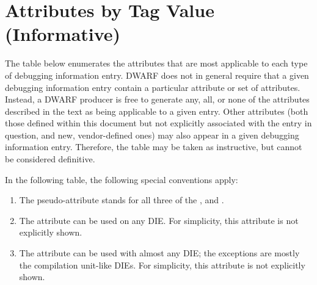 \chapter[Attributes by Tag (Informative)]{Attributes by Tag Value (Informative)}
\label{chap:attributesbytagvalueinformative}

The table below enumerates the attributes that are
most applicable to each type of debugging information
entry. DWARF does not in general require that a given
debugging information entry contain a particular attribute
or set of attributes. Instead, a DWARF producer is free to
generate any, all, or none of the attributes described in the
text as being applicable to a given entry. Other attributes
(both those defined within this document but not explicitly
associated with the entry in question, and new, vendor-defined
ones) may also appear in a given debugging information
entry. Therefore, the table may be taken as instructive, but
cannot be considered definitive.  

In the following table, the following special conventions apply:
\begin{enumerate}[1. ]
\item The pseudo-attribute
stands for all three of the
\DWATdeclcolumn,
\DWATdeclfile{} and 
\DWATdeclline.
\item The attribute \DWATsibling{} can be used on any DIE.
For simplicity, this attribute is not explicitly shown.
\item The attribute \DWATabstractorigin{} can be used with
almost any DIE; the exceptions are mostly the compilation
unit-like DIEs. For simplicity, this attribute is not 
explicitly shown. 
\end{enumerate}

\small

